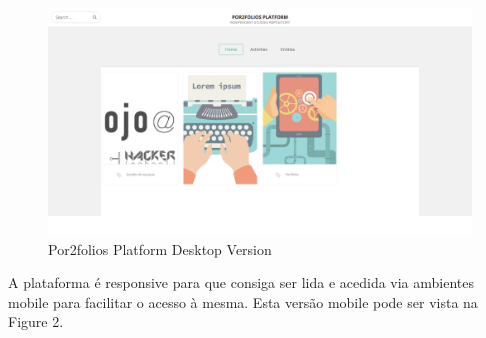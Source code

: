 \documentclass[a4paper,12pt,journal,twoside,compsoc]{PPIEEEtran}
\begin{document}
\begin{figure}[htb]
\centering
\includegraphics[width=1\linewidth]{desktop.png}
\caption{Por2folios Platform Desktop Version}
\label{fig_sim}
\end{figure}

A plataforma é responsive para que consiga ser lida e acedida via ambientes mobile para facilitar o acesso à mesma. Esta versão mobile pode ser vista na Figure 2.
\end{document}
